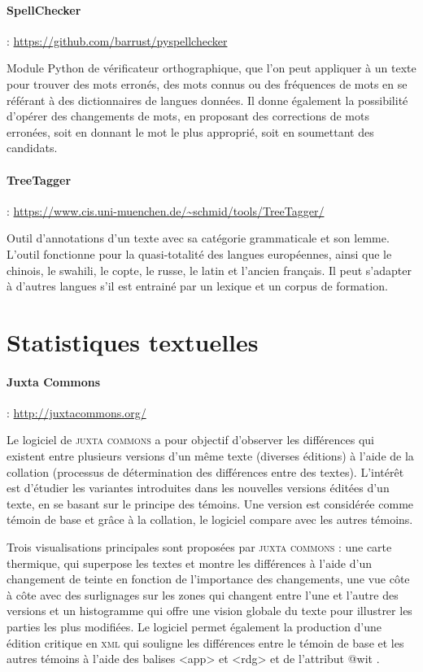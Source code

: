 \paragraph{SpellChecker} : \url{https://github.com/barrust/pyspellchecker}

Module Python de vérificateur orthographique, que l'on peut appliquer à un texte pour trouver des mots erronés, des mots connus ou des fréquences de mots en se référant à des dictionnaires de langues données. Il donne également la possibilité  d'opérer des changements de mots, en proposant des corrections de mots erronées, soit en donnant le mot le plus approprié, soit en soumettant des candidats.

\paragraph{TreeTagger} : \url{https://www.cis.uni-muenchen.de/~schmid/tools/TreeTagger/}

Outil d'annotations d'un texte avec sa catégorie grammaticale et son lemme. L'outil fonctionne pour la quasi-totalité des langues européennes, ainsi que le chinois, le swahili, le copte, le russe, le latin et l'ancien français. Il peut s'adapter à d'autres langues s'il est entrainé par un lexique et un corpus de formation. 

\section{Statistiques textuelles}
\paragraph{Juxta Commons} : \url{http://juxtacommons.org/}

Le logiciel de \textsc{juxta commons} a pour objectif d'observer les différences qui existent entre plusieurs versions d'un même texte (diverses éditions) à l'aide de la collation (processus de détermination des différences entre des textes). L'intérêt est d'étudier les variantes introduites dans les nouvelles versions éditées d'un texte, en se basant sur le principe des témoins. Une version est considérée comme \og témoin de base \fg{} et grâce à la collation, le logiciel compare avec les autres témoins.

Trois visualisations principales sont proposées par \textsc{juxta commons} : une carte thermique, qui superpose les textes et montre les différences à l'aide d'un changement de teinte en fonction de l'importance des changements, une vue côte à côte avec des surlignages sur les zones qui changent entre l'une et l'autre des versions et un histogramme qui offre une vision globale du texte pour illustrer les parties les plus modifiées. Le logiciel permet également la production d'une édition critique en \textsc{xml} qui souligne les différences entre le témoin de base et les autres témoins à l'aide des balises <app> et <rdg> et de l'attribut \og @wit \fg{}.

